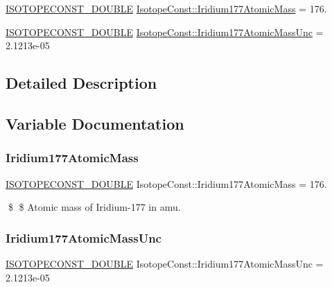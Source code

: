 \begin{DoxyCompactItemize}
\item 
\mbox{\hyperlink{group___isotope_const-_macros_ga8f45a7272ce02c0b4c65c44636ed719a}{I\+S\+O\+T\+O\+P\+E\+C\+O\+N\+S\+T\+\_\+\+D\+O\+U\+B\+LE}} \mbox{\hyperlink{group___isotope_const-_iridium-_ir177_ga21b643616512b51b4933d6f1128e4ad7}{Isotope\+Const\+::\+Iridium177\+Atomic\+Mass}} = 176.
\item 
\mbox{\hyperlink{group___isotope_const-_macros_ga8f45a7272ce02c0b4c65c44636ed719a}{I\+S\+O\+T\+O\+P\+E\+C\+O\+N\+S\+T\+\_\+\+D\+O\+U\+B\+LE}} \mbox{\hyperlink{group___isotope_const-_iridium-_ir177_ga58eb0daedf5169a8e6259e76f27e1193}{Isotope\+Const\+::\+Iridium177\+Atomic\+Mass\+Unc}} = 2.\+1213e-\/05
\end{DoxyCompactItemize}


\subsection{Detailed Description}


\subsection{Variable Documentation}
\mbox{\label{group___isotope_const-_iridium-_ir177_ga21b643616512b51b4933d6f1128e4ad7}} 
\subsubsection{\texorpdfstring{Iridium177\+Atomic\+Mass}{Iridium177AtomicMass}}
{\footnotesize\ttfamily \mbox{\hyperlink{group___isotope_const-_macros_ga8f45a7272ce02c0b4c65c44636ed719a}{I\+S\+O\+T\+O\+P\+E\+C\+O\+N\+S\+T\+\_\+\+D\+O\+U\+B\+LE}} Isotope\+Const\+::\+Iridium177\+Atomic\+Mass = 176.}

\$ \$ Atomic mass of Iridium-\/177 in amu. \mbox{\label{group___isotope_const-_iridium-_ir177_ga58eb0daedf5169a8e6259e76f27e1193}} 
\subsubsection{\texorpdfstring{Iridium177\+Atomic\+Mass\+Unc}{Iridium177AtomicMassUnc}}
{\footnotesize\ttfamily \mbox{\hyperlink{group___isotope_const-_macros_ga8f45a7272ce02c0b4c65c44636ed719a}{I\+S\+O\+T\+O\+P\+E\+C\+O\+N\+S\+T\+\_\+\+D\+O\+U\+B\+LE}} Isotope\+Const\+::\+Iridium177\+Atomic\+Mass\+Unc = 2.\+1213e-\/05}

